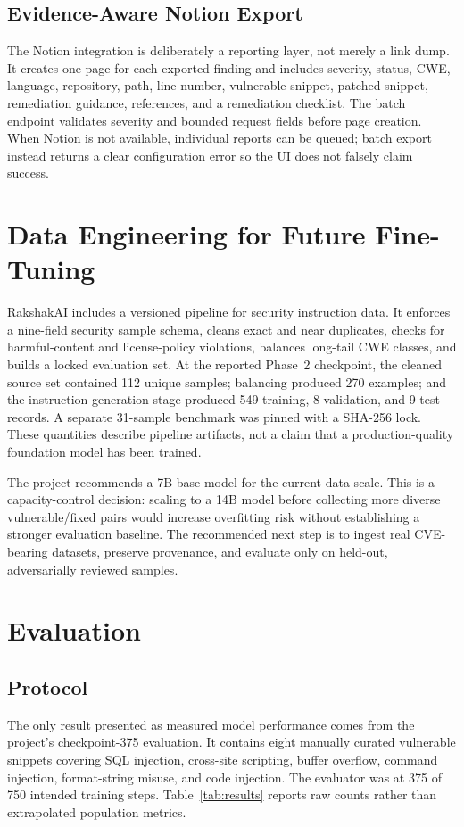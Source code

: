 \documentclass[10pt,conference]{IEEEtran}
\begin{document}
\subsection{Evidence-Aware Notion Export}
The Notion integration is deliberately a reporting layer, not merely a link dump. It creates one page for each exported finding and includes severity, status, CWE, language, repository, path, line number, vulnerable snippet, patched snippet, remediation guidance, references, and a remediation checklist. The batch endpoint validates severity and bounded request fields before page creation. When Notion is not available, individual reports can be queued; batch export instead returns a clear configuration error so the UI does not falsely claim success.

\section{Data Engineering for Future Fine-Tuning}
RakshakAI includes a versioned pipeline for security instruction data. It enforces a nine-field security sample schema, cleans exact and near duplicates, checks for harmful-content and license-policy violations, balances long-tail CWE classes, and builds a locked evaluation set. At the reported Phase~2 checkpoint, the cleaned source set contained 112 unique samples; balancing produced 270 examples; and the instruction generation stage produced 549 training, 8 validation, and 9 test records. A separate 31-sample benchmark was pinned with a SHA-256 lock. These quantities describe pipeline artifacts, not a claim that a production-quality foundation model has been trained.

The project recommends a 7B base model for the current data scale. This is a capacity-control decision: scaling to a 14B model before collecting more diverse vulnerable/fixed pairs would increase overfitting risk without establishing a stronger evaluation baseline. The recommended next step is to ingest real CVE-bearing datasets, preserve provenance, and evaluate only on held-out, adversarially reviewed samples.

\section{Evaluation}
\subsection{Protocol}
The only result presented as measured model performance comes from the project's checkpoint-375 evaluation. It contains eight manually curated vulnerable snippets covering SQL injection, cross-site scripting, buffer overflow, command injection, format-string misuse, and code injection. The evaluator was at 375 of 750 intended training steps. Table~\ref{tab:results} reports raw counts rather than extrapolated population metrics.
\end{document}
